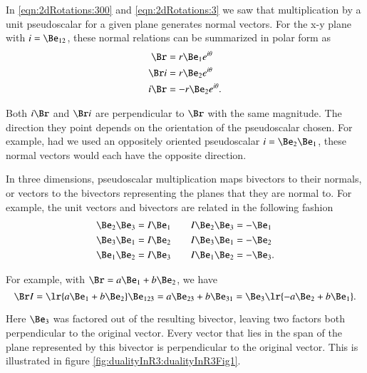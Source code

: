 %
%
In \cref{eqn:2dRotations:300} and \cref{eqn:2dRotations:3} we saw that multiplication by a unit pseudoscalar for a given plane generates normal vectors.  For the x-y plane with \( i = \Be_{12} \), these normal relations can be summarized in polar form as
\begin{equation}\label{eqn:dual:1620}
\begin{aligned}
\Br &= r \Be_1 e^{i\theta} \\
\Br i &= r \Be_2 e^{i\theta} \\
i \Br &= -r \Be_2 e^{i\theta}.
\end{aligned}
\end{equation}

Both \( i \Br \) and \( \Br i \) are perpendicular to \( \Br \) with the same magnitude.
The direction they point depends on the orientation of the pseudoscalar chosen.  For example,
had we used an oppositely oriented pseudoscalar \( i = \Be_2 \Be_1 \), these normal vectors would each have the opposite direction.

In three dimensions, pseudoscalar multiplication maps bivectors to their normals, or vectors to the bivectors representing the planes that they are normal to.  For example, the unit vectors and bivectors are related in the following fashion
\begin{equation}\label{eqn:dual:1580}
\begin{aligned}
\Be_2 \Be_3 &= I \Be_1 \qquad I \Be_2 \Be_3 = -\Be_1 \\
\Be_3 \Be_1 &= I \Be_2 \qquad I \Be_3 \Be_1 = -\Be_2 \\
\Be_1 \Be_2 &= I \Be_3 \qquad I \Be_1 \Be_2 = -\Be_3.
\end{aligned}
\end{equation}

For example, with \( \Br = a \Be_1 + b \Be_2 \), we have
\begin{dmath}\label{eqn:dual:1640}
\Br I
=
\lr{ a \Be_1 + b \Be_2 } \Be_{123}
=
a \Be_{23} + b \Be_{31}
=
\Be_3 \lr{ -a \Be_{2} + b \Be_{1} }.
\end{dmath}

Here \( \Be_3 \) was factored out of the resulting bivector, leaving two factors both perpendicular to the original vector.  Every vector that lies in the span of the plane represented by this bivector is perpendicular to the original vector.
This is illustrated in figure \cref{fig:dualityInR3:dualityInR3Fig1}.

